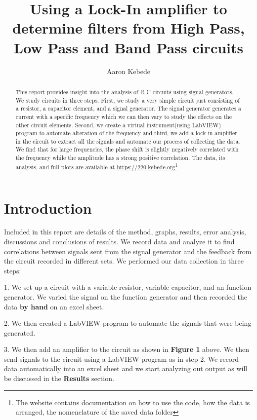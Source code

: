 \documentclass[twocolumn]{article}\usepackage[english]{babel}
\title{Using a Lock-In amplifier to determine filters from High Pass, Low Pass and Band Pass circuits }
\author{Aaron Kebede}
\date{}
\begin{document}
\maketitle
\begin{abstract}

This report provides insight into the analysis of R-C circuits using signal generators. We study circuits in three steps. First, we study a very simple circuit just consisting of a resistor, a capacitor element, and a signal generator. The signal generator generates a current with a specific frequency which we can then vary to study the effects on the other circuit elements. Second, we create a virtual instrument(using LabVIEW) program to automate alteration of the frequency and third, we add a lock-in amplifier in the circuit to extract all the signals and automate our process of collecting the data. We find that for large frequencies, the phase shift is slightly negatively correlated with the frequency while the amplitude has a strong positive correlation. The data, its analysis, and full plots are available at \url{https://220.kebede.org}\footnote[1]{The website contains documentation on how to use the code, how the data is arranged, the nomenclature of the saved data folder}

\end{abstract}

\section{Introduction}

Included in this report are details of the method, graphs, results, error analysis, discussions and conclusions of results. We record data and analyze it to find correlations between signals sent from the signal generator and the feedback from the circuit recorded in different sets.  
\newline
We performed our data collection in three steps:
\newline
\begin{Steps}
 \item{1. We set up a circuit with a variable resistor, variable capacitor, and  an function generator. We varied the signal on the function generator and then recorded the data \textbf{by hand} on an excel sheet.} \newline{}
 \item{2. We then created a LabVIEW program to automate the signals that were being generated. } \newline{}
 \item{3. We then add an amplifier to the circuit as shown in \textbf{Figure 1} above. We then send signals to the circuit using a LabVIEW program as in step 2. We record data automatically into an excel sheet and we start analyzing out output as will be discussed in the \textbf{Results} section.}
\end{Steps}
\end{document}
